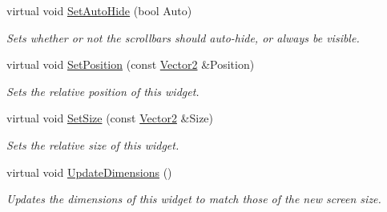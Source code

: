 \begin{DoxyCompactItemize}
virtual void \hyperlink{classMezzanine_1_1UI_1_1ScrolledCellGrid_a1b14bd16257f2cee916b49fc79a92b0f}{SetAutoHide} (bool Auto)
\begin{DoxyCompactList}\small\item\em Sets whether or not the scrollbars should auto-\/hide, or always be visible. \item\end{DoxyCompactList}\item 
virtual void \hyperlink{classMezzanine_1_1UI_1_1ScrolledCellGrid_ab4e8250c846990325c3a6ccfbf5b322a}{SetPosition} (const \hyperlink{classMezzanine_1_1Vector2}{Vector2} \&Position)
\begin{DoxyCompactList}\small\item\em Sets the relative position of this widget. \item\end{DoxyCompactList}\item 
virtual void \hyperlink{classMezzanine_1_1UI_1_1ScrolledCellGrid_ac924cf5c94e3eb52bffc7d984683f1e6}{SetSize} (const \hyperlink{classMezzanine_1_1Vector2}{Vector2} \&Size)
\begin{DoxyCompactList}\small\item\em Sets the relative size of this widget. \item\end{DoxyCompactList}\item 
virtual void \hyperlink{classMezzanine_1_1UI_1_1ScrolledCellGrid_abb580fbe187054004c6f3f0eadec8b7e}{UpdateDimensions} ()
\begin{DoxyCompactList}\small\item\em Updates the dimensions of this widget to match those of the new screen size. \item\end{DoxyCompactList}\end{DoxyCompactItemize}
